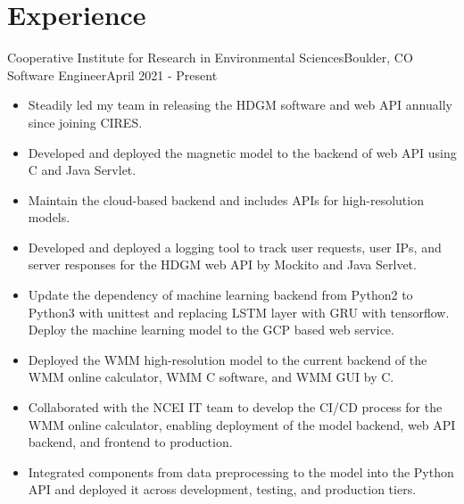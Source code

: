 \section{Experience}

\resumeSubHeadingListStart

\resumeSubheading
{Cooperative Institute for Research in Environmental Sciences}{Boulder, CO}
{Software Engineer}{April 2021 - Present}

\resumeItemListStart

 
  \begin{itemize}
  	\item Steadily led my team in releasing the HDGM software and web API annually since joining CIRES.
  	\item Developed and deployed the magnetic model to the backend of web API using C and Java Servlet. 
  	\item Maintain the cloud-based backend  and includes APIs for high-resolution models.
  	\item Developed and deployed a logging tool to track user requests, user IPs, and server responses for the HDGM web API by Mockito and Java Serlvet.
  	\item Update the dependency of machine learning backend from Python2 to Python3 with unittest and replacing LSTM layer with GRU with tensorflow. Deploy the machine learning model to the GCP based web service.
  	
  \end{itemize}
  
  \begin{itemize}
  	\item Deployed the WMM high-resolution model to the current backend of the WMM online calculator, WMM C software, and WMM GUI by C.
  	\item Collaborated with the NCEI IT team to develop the CI/CD process for the WMM online calculator, enabling deployment of the model backend, web API backend, and frontend to production.
  	\item Integrated components from data preprocessing to the model into the Python API and deployed it across development, testing, and production tiers.
  	
  \end{itemize}
  
